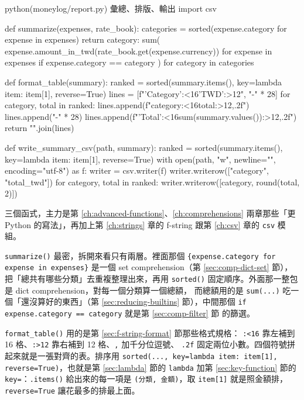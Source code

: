 \begin{example}{python}{(moneylog/report.py) 彙總、排版、輸出}
import csv


def summarize(expenses, rate_book):
    categories = sorted({expense.category for expense in expenses})
    return {
        category: sum(
            expense.amount_in_twd(rate_book.get(expense.currency))
            for expense in expenses
            if expense.category == category
        )
        for category in categories
    }


def format_table(summary):
    ranked = sorted(summary.items(), key=lambda item: item[1], reverse=True)
    lines = [f"{'Category':<16}{'TWD':>12}", "-" * 28]
    for category, total in ranked:
        lines.append(f"{category:<16}{total:>12,.2f}")
    lines.append("-" * 28)
    lines.append(f"{'Total':<16}{sum(summary.values()):>12,.2f}")
    return "\n".join(lines)


def write_summary_csv(path, summary):
    ranked = sorted(summary.items(), key=lambda item: item[1], reverse=True)
    with open(path, "w", newline="", encoding="utf-8") as f:
        writer = csv.writer(f)
        writer.writerow(["category", "total_twd"])
        for category, total in ranked:
            writer.writerow([category, round(total, 2)])
\end{example}

三個函式，主力是第 \ref{ch:advanced-functions}、\ref{ch:comprehensions} 兩章那些「更
Python 的寫法」，再加上第 \ref{ch:strings} 章的 f-string 跟第 \ref{ch:csv} 章的
\texttt{csv} 模組。

\texttt{summarize()} 最密，拆開來看只有兩層。裡面那個
\texttt{\{expense.category for expense in expenses\}} 是一個 set comprehension（第
\ref{sec:comp-dict-set} 節），把「總共有哪些分類」去重複整理出來，再用
\texttt{sorted()} 固定順序。外面那一整包是 dict comprehension，對每一個分類算一個總額，
而總額用的是 \texttt{sum(...)} 吃一個「還沒算好的東西」（第 \ref{sec:reducing-builtins}
節），中間那個 \texttt{if expense.category == category} 就是第 \ref{sec:comp-filter} 節
的篩選。

\texttt{format\_table()} 用的是第 \ref{sec:f-string-format} 節那些格式規格：
\texttt{:<16} 靠左補到 16 格、\texttt{:>12} 靠右補到 12 格、\texttt{,} 加千分位逗號、
\texttt{.2f} 固定兩位小數。四個符號拼起來就是一張對齊的表。排序用
\texttt{sorted(..., key=lambda item: item[1], reverse=True)}，也就是第 \ref{sec:lambda}
節的 \texttt{lambda} 加第 \ref{sec:key-function} 節的 \texttt{key=}：\texttt{.items()}
給出來的每一項是 \texttt{(分類, 金額)}，取 \texttt{item[1]} 就是照金額排，
\texttt{reverse=True} 讓花最多的排最上面。

